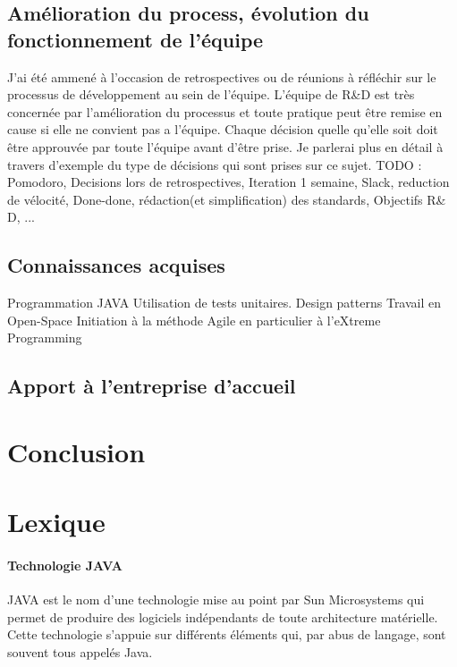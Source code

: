 \documentclass[12pt,oneside]{book}
\begin{document}
\subsection{Amélioration du process, évolution du fonctionnement de l'équipe}
J'ai été ammené à l'occasion de retrospectives ou de réunions à réfléchir sur le processus de développement au sein de l'équipe. L'équipe de R\&D est très concernée par l'amélioration du processus et toute pratique peut être remise en cause si elle ne convient pas a l'équipe. Chaque décision quelle qu'elle soit doit être approuvée par toute l'équipe avant d'être prise. Je parlerai plus en détail à travers d'exemple du type de décisions qui sont prises sur ce sujet.
TODO : Pomodoro, Decisions lors de retrospectives, Iteration 1 semaine, Slack, reduction de vélocité, Done-done, rédaction(et simplification) des standards, Objectifs R\& D, ...

\subsection{Connaissances acquises}
Programmation JAVA
Utilisation de tests unitaires.
Design patterns
Travail en Open-Space
Initiation à la méthode Agile en particulier à l'eXtreme Programming

\subsection{Apport à l'entreprise d'accueil}

\section{Conclusion}

\section{Lexique}
\paragraph{Technologie JAVA}
JAVA est le nom d'une technologie mise au point par Sun Microsystems qui permet de produire des logiciels indépendants de toute architecture matérielle. Cette technologie s'appuie sur différents éléments qui, par abus de langage, sont souvent tous appelés Java.
\end{document}
